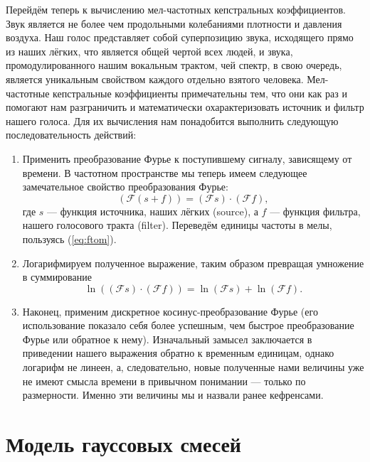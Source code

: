 \documentclass{gost-7-32}
\begin{document}
Перейдём теперь к вычислению мел-частотных кепстральных коэффициентов.
Звук является не более чем продольными колебаниями плотности и давления воздуха.
Наш голос представляет собой суперпозицию звука, исходящего прямо из наших лёгких, что является общей чертой всех людей, и звука, промодулированного нашим вокальным трактом, чей спектр, в свою очередь, является уникальным свойством каждого отдельно взятого человека.
Мел-частотные кепстральные коэффициенты примечательны тем, что они как раз и помогают нам разграничить и математически охарактеризовать источник и фильтр нашего голоса.
Для их вычисления нам понадобится выполнить следующую последовательность действий:
\begin{enumerate}
    \item Применить преобразование Фурье к поступившему сигналу, зависящему от времени.
        В частотном пространстве мы теперь имеем следующее замечательное свойство преобразования Фурье:
        \begin{equation}
            \left(\mathcal{F} (s + f) \right) = (\mathcal{F} s) \cdot (\mathcal{F} f),
        \end{equation}
        где $s$ --- функция источника, наших лёгких (source), а $f$ --- функция фильтра, нашего голосового тракта (filter).
        Переведём единицы частоты в мелы, пользуясь (\ref{eq:ftom}).

    \item Логарифмируем полученное выражение, таким образом превращая умножение в суммирование
        \begin{equation}
            \ln \left( (\mathcal{F} s) \cdot (\mathcal{F} f) \right) = \ln (\mathcal{F} s) + \ln (\mathcal{F} f).
        \end{equation}

    \item Наконец, применим дискретное косинус-преобразование Фурье (его использование показало себя более успешным, чем быстрое преобразование Фурье или обратное к нему).
        Изначальный замысел заключается в приведении нашего выражения обратно к временным единицам, однако логарифм не линеен, а, следовательно, новые полученные нами величины уже не имеют смысла времени в привычном понимании --- только по размерности.
        Именно эти величины мы и назвали ранее кефренсами.
\end{enumerate}

\section{Модель гауссовых смесей}
\end{document}
